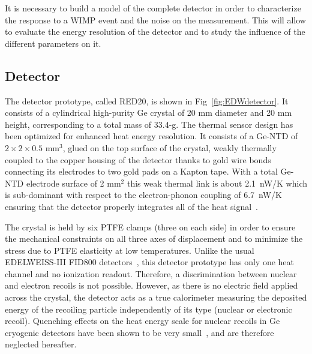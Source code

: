 It is necessary to build a model of the complete detector in order to characterize the response to a WIMP event and the noise on the measurement. This will allow to evaluate the energy resolution of the detector and to study the influence of the different parameters on it.



\subsection{Detector}
\label{sec:detector}

The detector prototype, called RED20, is shown in Fig~\ref{fig:EDWdetector}. It consists of a cylindrical high-purity Ge crystal of 20 mm diameter and 20 mm height, corresponding to a total mass of 33.4-g. 
The thermal sensor design has been optimized for enhanced heat energy resolution. It consists of a Ge-NTD of $2\times 2\times 0.5$ mm$^3$, glued on the top surface of the crystal, weakly thermally coupled to the copper housing of the detector thanks to gold wire bonds connecting its electrodes to two gold pads on a Kapton tape.   
With a total Ge-NTD electrode surface of 2 mm$^2$ this weak thermal link is about 2.1~nW/K which is sub-dominant with respect to the electron-phonon coupling of 6.7~nW/K ensuring that the detector properly integrates all of the heat signal~\cite{Pyle:2015pya}.

The crystal is held by six PTFE clamps (three on each side) in order to ensure the mechanical constraints on all three axes of displacement and to minimize the stress due to PTFE elasticity at low temperatures. Unlike the usual EDELWEISS-III FID800 detectors~\cite{Armengaud:2017rzu}, this detector prototype has only one heat channel and no ionization readout. Therefore, a discrimination between nuclear and electron recoils is not possible. However, as there is no electric field applied across the crystal, the detector acts as a true calorimeter measuring the deposited energy of the recoiling particle independently of its type (nuclear or electronic recoil).
Quenching effects on the heat energy scale for nuclear recoils in Ge cryogenic detectors have been shown to be very small~\cite{Benoit:2006qc,Agnese:2018nbs}, and are therefore neglected hereafter. 


